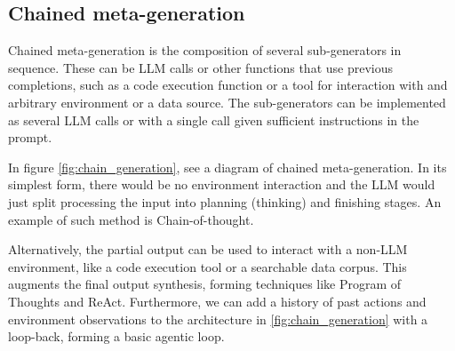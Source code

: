 \subsection{Chained meta-generation}

Chained meta-generation is the composition of several sub-generators in sequence. 
These can be LLM calls or other functions that use previous completions, such as a code execution function\cite{chen2023programthoughtspromptingdisentangling}
or a tool for interaction with and arbitrary environment or a data source\cite{yao2023reactsynergizingreasoningacting}.
The sub-generators can be implemented as several LLM calls or with a single call given sufficient instructions in the prompt\cite{khattab2023dspycompilingdeclarativelanguage}.

In figure \ref{fig:chain_generation}, see a diagram of chained meta-generation. In its simplest form, there would be no environment interaction and the LLM would just 
split processing the input into planning (thinking) and finishing stages. An example of such method is Chain-of-thought\cite{NEURIPS2022_8bb0d291}\cite{wei2023chainofthoughtpromptingelicitsreasoning}.

Alternatively, the partial output can be used to interact with a non-LLM environment, like a code execution tool or a searchable data corpus.
This augments the final output synthesis, forming techniques like Program of Thoughts\cite{chen2023programthoughtspromptingdisentangling} and ReAct\cite{yao2023reactsynergizingreasoningacting}.
Furthermore, we can add a history of past actions and environment observations to the architecture in \ref{fig:chain_generation} with a loop-back, forming a basic agentic loop.


